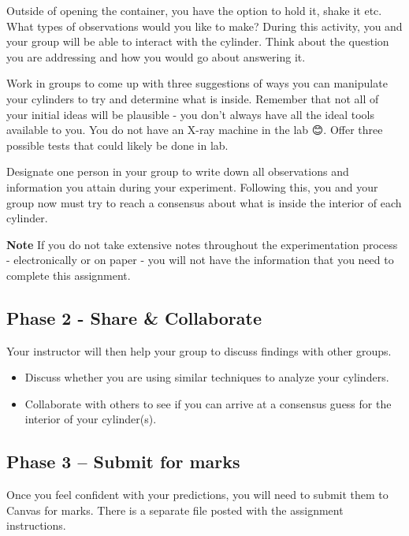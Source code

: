 \documentclass[
]{book}
\providecommand{\tightlist}{%
  \setlength{\itemsep}{0pt}\setlength{\parskip}{0pt}}
\begin{document}
Outside of opening the container, you have the option to hold it, shake it etc. What types of observations would you like to make? During this activity, you and your group will be able to interact with the cylinder. Think about the question you are addressing and how you would go about answering it.

Work in groups to come up with three suggestions of ways you can manipulate your cylinders to try and determine what is inside. Remember that not all of your initial ideas will be plausible - you don't always have all the ideal tools available to you. You do not have an X-ray machine in the lab 😊. Offer three possible tests that could likely be done in lab.

Designate one person in your group to write down all observations and information you attain during your experiment. Following this, you and your group now must try to reach a consensus about what is inside the interior of each cylinder.

\textbf{Note} If you do not take extensive notes throughout the experimentation process - electronically or on paper - you will not have the information that you need to complete this assignment.

\hypertarget{phase-2---share-collaborate}{%
\subsection*{Phase 2 - Share \& Collaborate}\label{phase-2---share-collaborate}}

Your instructor will then help your group to discuss findings with other groups.

\begin{itemize}
\tightlist
\item
  Discuss whether you are using similar techniques to analyze your cylinders.
\item
  Collaborate with others to see if you can arrive at a consensus guess for the interior of your cylinder(s).
\end{itemize}

\hypertarget{phase-3-submit-for-marks}{%
\subsection*{Phase 3 -- Submit for marks}\label{phase-3-submit-for-marks}}

Once you feel confident with your predictions, you will need to submit them to Canvas for marks. There is a separate file posted with the assignment instructions.
\end{document}
